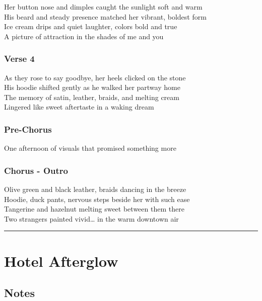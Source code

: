 Her button nose and dimples caught the sunlight soft and warm\\
His beard and steady presence matched her vibrant, boldest form\\
Ice cream drips and quiet laughter, colors bold and true\\
A picture of attraction in the shades of me and you

\subsubsection{Verse 4}\label{verse-4-5}

As they rose to say goodbye, her heels clicked on the stone\\
His hoodie shifted gently as he walked her partway home\\
The memory of satin, leather, braids, and melting cream\\
Lingered like sweet aftertaste in a waking dream

\subsubsection{Pre-Chorus}\label{pre-chorus-27}

One afternoon of visuals that promised something more

\subsubsection{Chorus - Outro}\label{chorus---outro-1}

Olive green and black leather, braids dancing in the breeze\\
Hoodie, duck pants, nervous steps beside her with such ease\\
Tangerine and hazelnut melting sweet between them there\\
Two strangers painted vivid\ldots{} in the warm downtown air

\begin{center}\rule{0.5\linewidth}{0.5pt}\end{center}

\section{Hotel Afterglow}\label{hotel-afterglow}

\subsection{Notes}\label{notes-41}

